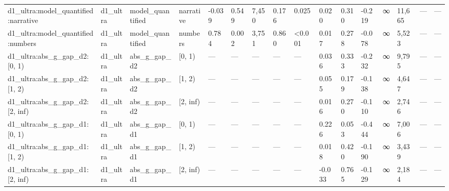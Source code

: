 \begin{tabular}{llllllllllllllll}
d1\_ultra:model\_quantified:narrative & d1\_ultra & model\_quantified & narrative & -0.039 & 0.549 & 7,450 & 0.176 & 0.025 & 0.020 & 0.310 & -0.219 & ∞ & 11,665 & — & — \\
d1\_ultra:model\_quantified:numbers & d1\_ultra & model\_quantified & numbers & 0.784 & 0.002 & 3,751 & 0.860 & <0.001 & 0.017 & 0.278 & -0.078 & ∞ & 5,523 & — & — \\
d1\_ultra:abs\_g\_gap\_d2:[0, 1) & d1\_ultra & abs\_g\_gap\_d2 & [0, 1) & — & — & — & — & — & 0.036 & 0.333 & -0.232 & ∞ & 9,795 & — & — \\
d1\_ultra:abs\_g\_gap\_d2:[1, 2) & d1\_ultra & abs\_g\_gap\_d2 & [1, 2) & — & — & — & — & — & 0.055 & 0.179 & -0.138 & ∞ & 4,647 & — & — \\
d1\_ultra:abs\_g\_gap\_d2:[2, inf) & d1\_ultra & abs\_g\_gap\_d2 & [2, inf) & — & — & — & — & — & 0.016 & 0.270 & -0.110 & ∞ & 2,746 & — & — \\
d1\_ultra:abs\_g\_gap\_d1:[0, 1) & d1\_ultra & abs\_g\_gap\_d1 & [0, 1) & — & — & — & — & — & 0.226 & 0.053 & -0.444 & ∞ & 7,006 & — & — \\
d1\_ultra:abs\_g\_gap\_d1:[1, 2) & d1\_ultra & abs\_g\_gap\_d1 & [1, 2) & — & — & — & — & — & 0.018 & 0.420 & -0.190 & ∞ & 3,439 & — & — \\
d1\_ultra:abs\_g\_gap\_d1:[2, inf) & d1\_ultra & abs\_g\_gap\_d1 & [2, inf) & — & — & — & — & — & -0.033 & 0.765 & -0.129 & ∞ & 2,184 & — & — \\
\bottomrule
\end{tabular}

